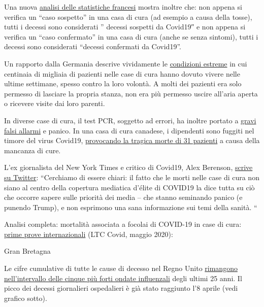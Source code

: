 Una nuova
\href{https://covidinfos.net/covid19/deces-dus-au-covid-19-le-nombre-officiel-de-morts-en-france-est-il-surestime/502/}{analisi
delle statistiche francesi} mostra inoltre che: non appena si verifica
un ``caso sospetto'' in una casa di cura (ad esempio a causa della
tosse), tutti i decessi sono considerati '' decessi sospetti da Covid19″
e non appena si verifica un ``caso confermato'' in una casa di cura
(anche se senza sintomi), tutti i decessi sono considerati ``decessi
confermati da Covid19''.

Un rapporto dalla Germania descrive vividamente le
\href{https://www.rnd.de/gesundheit/corona-ist-mir-egal-warum-helga-witt-kronshage-86-lieber-sterben-will-als-eingesperrt-zu-sein-3MEBDIOBEFA6BDULC4N5WGZJG4.html}{condizioni
estreme} in cui centinaia di migliaia di pazienti nelle case di cura
hanno dovuto vivere nelle ultime settimane, spesso contro la loro
volontà. A molti dei pazienti era solo permesso di lasciare la propria
stanza, non era più permesso uscire all'aria aperta o ricevere visite
dai loro parenti.

In diverse case di cura, il test PCR, soggetto ad errori, ha inoltre
portato a
\href{https://www.wjhl.com/local-coronavirus-coverage/agape-nursing-home-says-residents-who-tested-positive-for-covid-19-were-false-positives/}{gravi
falsi allarmi} e panico. In una casa di cura canadese, i dipendenti sono
fuggiti nel timore del virus Covid19,
\href{https://www.nytimes.com/2020/04/16/world/canada/montreal-nursing-homes-coronavirus.html}{provocando
la tragica morte di 31 pazienti} a causa della mancanza di cure.

L'ex giornalista del New York Times e critico di Covid19, Alex Berenson,
\href{https://twitter.com/AlexBerenson/status/1257496834043531267}{scrive
su Twitter}: ``Cerchiamo di essere chiari: il fatto che le morti nelle
case di cura non siano al centro della copertura mediatica d'élite di
COVID19 la dice tutta su ciò che occorre sapere sulle priorità dei media
-- che stanno seminando panico (e punendo Trump), e non esprimono una
sana informazione sui temi della sanità. ``

Analisi completa: mortalità associata a focolai di COVID-19 in case di
cura:
\href{https://ltccovid.org/2020/04/12/mortality-associated-with-covid-19-outbreaks-in-care-homes-early-international-evidence/}{prime
prove internazionali} (LTC Covid, maggio 2020):

Gran Bretagna

Le cifre cumulative di tutte le cause di decesso nel Regno Unito
\href{http://inproportion2.talkigy.com/}{rimangono nell'intervallo delle
cinque più forti ondate influenzali} degli ultimi 25 anni. Il picco dei
decessi giornalieri ospedalieri è già stato raggiunto l'8 aprile (vedi
grafico sotto).

